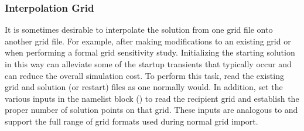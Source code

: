\subsubsection{Interpolation Grid}
\label{SEC:Files:Interpolation_Grid}


It is sometimes desirable to interpolate the solution from one
grid file onto another grid file.
%
For example, after making modifications to an existing grid or
when performing a formal grid sensitivity study.
%
Initializing the starting solution in this way can alleviate some
of the startup transients that typically occur and can reduce the
overall simulation cost.
%
To perform this task, read the existing grid and solution
(or restart) files as one normally would.  
%
In addition, set the various inputs in the
 namelist block ()
to read the recipient grid and establish the proper number
of solution points on that grid.
%
These inputs are analogous to and support the full range of
grid formats used during normal grid import.





